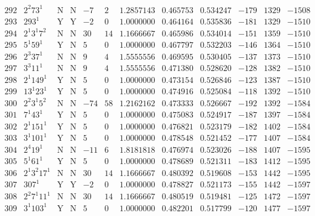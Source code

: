 \documentclass[11pt,reqno,a4letter]{article}
\numberwithin{figure}{section}
\numberwithin{table}{section}
\theoremstyle{plain}
\numberwithin{theorem}{section}
\theoremstyle{definition}
\begin{document}
\begin{table}[h!]
\begin{equation*}
{\begin{array}{cc|cc|ccc|cc|ccc}
 292 & 2^2 73^1 & \text{N} & \text{N} & -7 & 2 & 1.2857143 & 0.465753 & 0.534247 & -179 & 1329 & -1508 \\
 293 & 293^1 & \text{Y} & \text{Y} & -2 & 0 & 1.0000000 & 0.464164 & 0.535836 & -181 & 1329 & -1510 \\
 294 & 2^1 3^1 7^2 & \text{N} & \text{N} & 30 & 14 & 1.1666667 & 0.465986 & 0.534014 & -151 & 1359 & -1510 \\
 295 & 5^1 59^1 & \text{Y} & \text{N} & 5 & 0 & 1.0000000 & 0.467797 & 0.532203 & -146 & 1364 & -1510 \\
 296 & 2^3 37^1 & \text{N} & \text{N} & 9 & 4 & 1.5555556 & 0.469595 & 0.530405 & -137 & 1373 & -1510 \\
 297 & 3^3 11^1 & \text{N} & \text{N} & 9 & 4 & 1.5555556 & 0.471380 & 0.528620 & -128 & 1382 & -1510 \\
 298 & 2^1 149^1 & \text{Y} & \text{N} & 5 & 0 & 1.0000000 & 0.473154 & 0.526846 & -123 & 1387 & -1510 \\
 299 & 13^1 23^1 & \text{Y} & \text{N} & 5 & 0 & 1.0000000 & 0.474916 & 0.525084 & -118 & 1392 & -1510 \\
 300 & 2^2 3^1 5^2 & \text{N} & \text{N} & -74 & 58 & 1.2162162 & 0.473333 & 0.526667 & -192 & 1392 & -1584 \\
 301 & 7^1 43^1 & \text{Y} & \text{N} & 5 & 0 & 1.0000000 & 0.475083 & 0.524917 & -187 & 1397 & -1584 \\
 302 & 2^1 151^1 & \text{Y} & \text{N} & 5 & 0 & 1.0000000 & 0.476821 & 0.523179 & -182 & 1402 & -1584 \\
 303 & 3^1 101^1 & \text{Y} & \text{N} & 5 & 0 & 1.0000000 & 0.478548 & 0.521452 & -177 & 1407 & -1584 \\
 304 & 2^4 19^1 & \text{N} & \text{N} & -11 & 6 & 1.8181818 & 0.476974 & 0.523026 & -188 & 1407 & -1595 \\
 305 & 5^1 61^1 & \text{Y} & \text{N} & 5 & 0 & 1.0000000 & 0.478689 & 0.521311 & -183 & 1412 & -1595 \\
 306 & 2^1 3^2 17^1 & \text{N} & \text{N} & 30 & 14 & 1.1666667 & 0.480392 & 0.519608 & -153 & 1442 & -1595 \\
 307 & 307^1 & \text{Y} & \text{Y} & -2 & 0 & 1.0000000 & 0.478827 & 0.521173 & -155 & 1442 & -1597 \\
 308 & 2^2 7^1 11^1 & \text{N} & \text{N} & 30 & 14 & 1.1666667 & 0.480519 & 0.519481 & -125 & 1472 & -1597 \\
 309 & 3^1 103^1 & \text{Y} & \text{N} & 5 & 0 & 1.0000000 & 0.482201 & 0.517799 & -120 & 1477 & -1597 \\

\end{array}}
\end{equation*}
\end{table}
\end{document}
